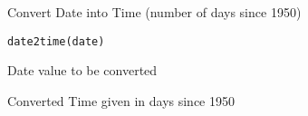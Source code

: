 %
\begin{Description}\relax
Convert Date into Time (number of days since 1950)
\end{Description}
%
\begin{Usage}
\begin{verbatim}
date2time(date)
\end{verbatim}
\end{Usage}
%
\begin{Arguments}
\begin{ldescription}
\item[\code{date}] 
Date value to be converted

\end{ldescription}
\end{Arguments}
%
\begin{Value}
Converted Time given in days since 1950
\end{Value}
